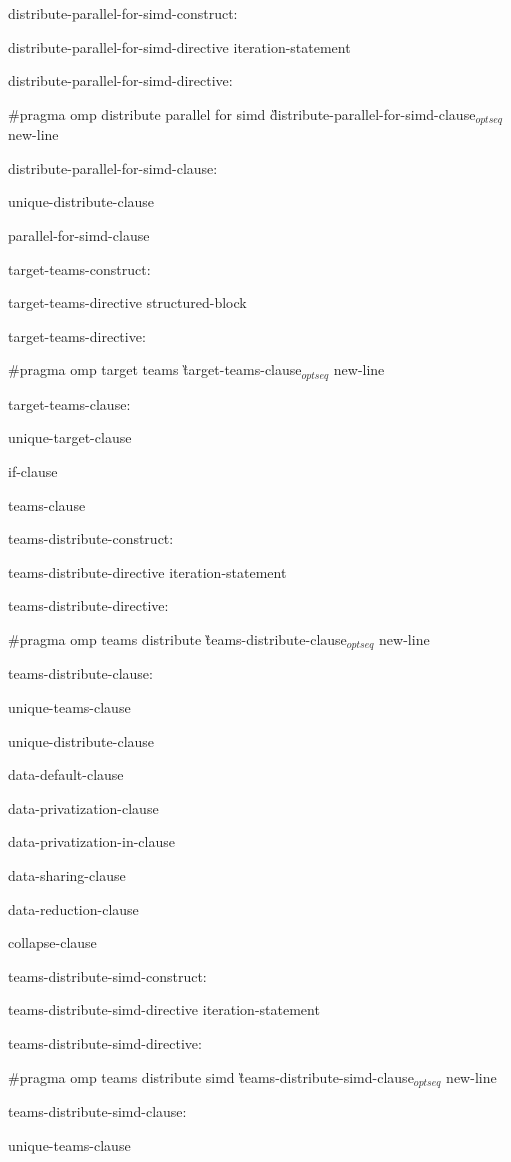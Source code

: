 {distribute-parallel-for-simd-construct:

\I distribute-parallel-for-simd-directive iteration-statement

distribute-parallel-for-simd-directive:

\C\I \#pragma omp distribute parallel for simd \G distribute-parallel-for-simd-clause$_{optseq}$ new-line

distribute-parallel-for-simd-clause:

\I unique-distribute-clause

\I parallel-for-simd-clause

target-teams-construct:

\I target-teams-directive structured-block

target-teams-directive:

\C\I \#pragma omp target teams \G target-teams-clause$_{optseq}$ new-line

target-teams-clause:

\I unique-target-clause

\I if-clause

\I teams-clause

teams-distribute-construct:

\I teams-distribute-directive iteration-statement

teams-distribute-directive:

\C\I \#pragma omp teams distribute \G teams-distribute-clause$_{optseq}$ new-line

teams-distribute-clause:

\I unique-teams-clause

\I unique-distribute-clause

\I data-default-clause

\I data-privatization-clause

\I data-privatization-in-clause

\I data-sharing-clause

\I data-reduction-clause

\I collapse-clause

teams-distribute-simd-construct:

\I teams-distribute-simd-directive iteration-statement

teams-distribute-simd-directive:

\C\I \#pragma omp teams distribute simd \G teams-distribute-simd-clause$_{optseq}$ new-line

teams-distribute-simd-clause:

\I unique-teams-clause

}
